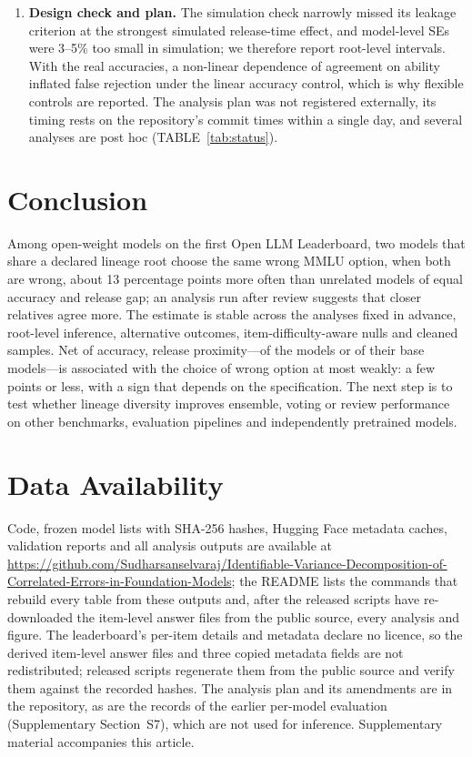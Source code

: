 \documentclass{ieeeaccess}
\theoremstyle{definition}
\theoremstyle{plain}
\begin{document}
\begin{enumerate}
\item \textbf{Design check and plan.} The simulation check narrowly missed its leakage criterion at the strongest simulated release-time effect, and model-level SEs were 3--5\% too small in simulation; we therefore report root-level intervals. With the real accuracies, a non-linear dependence of agreement on ability inflated false rejection under the linear accuracy control, which is why flexible controls are reported. The analysis plan was not registered externally, its timing rests on the repository's commit times within a single day, and several analyses are post hoc (TABLE~\ref{tab:status}).
\end{enumerate}

\section{Conclusion}
\label{sec:conclusion}
Among open-weight models on the first Open LLM Leaderboard, two models that share a declared lineage root choose the same wrong MMLU option, when both are wrong, about 13 percentage points more often than unrelated models of equal accuracy and release gap; an analysis run after review suggests that closer relatives agree more. The estimate is stable across the analyses fixed in advance, root-level inference, alternative outcomes, item-difficulty-aware nulls and cleaned samples. Net of accuracy, release proximity---of the models or of their base models---is associated with the choice of wrong option at most weakly: a few points or less, with a sign that depends on the specification. The next step is to test whether lineage diversity improves ensemble, voting or review performance on other benchmarks, evaluation pipelines and independently pretrained models.

\section*{Data Availability}
{\sloppy
Code, frozen model lists with SHA-256 hashes, Hugging Face metadata caches, validation reports and all analysis outputs are available at \url{https://github.com/Sudharsanselvaraj/Identifiable-Variance-Decomposition-of-Correlated-Errors-in-Foundation-Models}; the README lists the commands that rebuild every table from these outputs and, after the released scripts have re-downloaded the item-level answer files from the public source, every analysis and figure. The leaderboard's per-item details and metadata declare no licence, so the derived item-level answer files and three copied metadata fields are not redistributed; released scripts regenerate them from the public source and verify them against the recorded hashes. The analysis plan and its amendments are in the repository, as are the records of the earlier per-model evaluation (Supplementary Section~S7), which are not used for inference. Supplementary material accompanies this article.\par}
\end{document}
